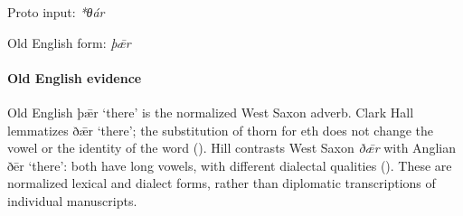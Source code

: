 \documentclass[
  british,
  a4paper,
]{article}
\begin{document}
Proto input: \emph{*θár}

\begingroup
\setlength{\fboxsep}{6pt}

\noindent{} \endgroup

Old English form: \emph{þǣr}

\paragraph{Old English evidence}\label{old-english-evidence-65}

Old English {þǣr} `there' is the normalized West Saxon adverb. Clark
Hall lemmatizes {ðǣr} `there'; the substitution of thorn for eth does
not change the vowel or the identity of the word
(). Hill contrasts
West Saxon \emph{ðǣr} with Anglian {ðēr} `there': both have long vowels,
with different dialectal qualities (). These are normalized lexical and dialect forms, rather than
diplomatic transcriptions of individual manuscripts.
\end{document}
